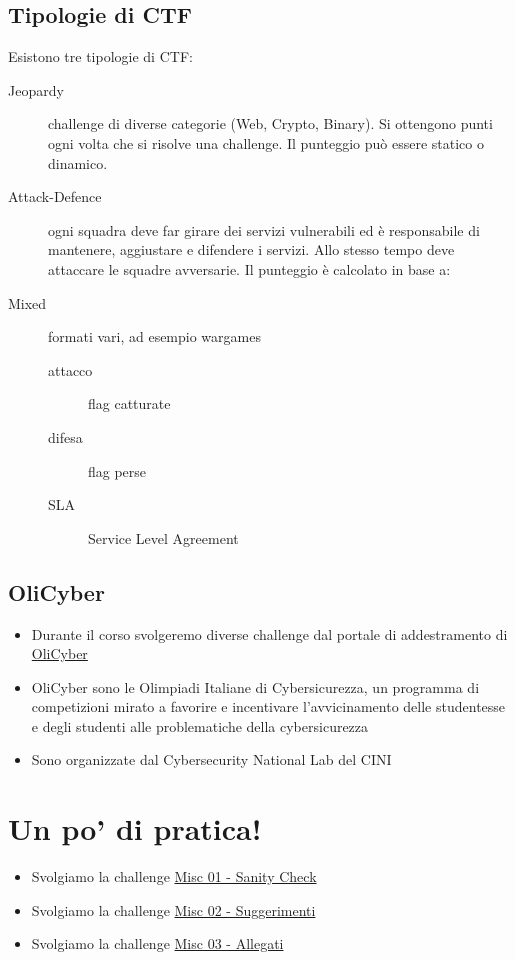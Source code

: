 \documentclass{beamer}
\begin{document}
\subsection*{Tipologie di CTF}
\begin{frame}{\insertsection}{\insertsubsection}
Esistono tre tipologie di CTF:
\begin{description}
\item[Jeopardy] challenge di diverse categorie (Web, Crypto, Binary). Si
ottengono punti ogni volta che si risolve una challenge. Il punteggio
può essere statico o dinamico.
\item[Attack-Defence] ogni squadra deve far girare dei servizi vulnerabili ed è
responsabile di mantenere, aggiustare e difendere i servizi. Allo stesso tempo
deve attaccare le squadre avversarie. Il punteggio è calcolato in base a:
\item[Mixed] formati vari, ad esempio wargames
\begin{description}
\item[attacco] flag catturate
\item[difesa] flag perse
\item[SLA] Service Level Agreement
\end{description}
\end{description}
\end{frame}

\subsection*{OliCyber}
\begin{frame}[allowframebreaks]{\insertsection}{\insertsubsection}
\begin{itemize}
\item Durante il corso svolgeremo diverse challenge dal portale di addestramento
di \alert{\href{https://training.olicyber.it}{OliCyber}}
\item \alert{OliCyber} sono le Olimpiadi Italiane di Cybersicurezza, un
programma di competizioni mirato a favorire e incentivare
l'avvicinamento delle studentesse e degli studenti alle
problematiche della cybersicurezza
\item Sono organizzate dal \alert{Cybersecurity National Lab} del \alert{CINI}
\end{itemize}
\end{frame}

\section{Un po' di pratica!}
\begin{frame}{\insertsection}
\begin{itemize}
\item Svolgiamo la challenge \href{https://training.olicyber.it/challenges\#challenge-248}{Misc 01 - Sanity Check}
\item Svolgiamo la challenge \href{https://training.olicyber.it/challenges\#challenge-249}{Misc 02 - Suggerimenti}
\item Svolgiamo la challenge \href{https://training.olicyber.it/challenges\#challenge-250}{Misc 03 - Allegati}
\end{itemize}
\end{frame}
\end{document}
